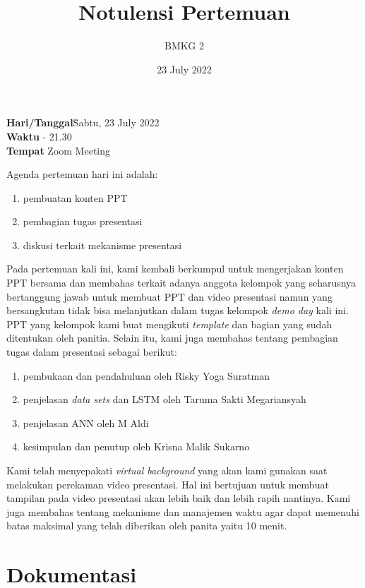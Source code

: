 \documentclass[12pt, a4paper]{article}
\title{Notulensi Pertemuan}
\author{BMKG 2}
\date{23 July 2022}
\begin{document}
\maketitle

\begin{tabbing}
\textbf{Hari/Tanggal}\quad\= Sabtu, 23 July 2022 \\
\textbf{Waktu}  - 21.30 \\
\textbf{Tempat}\> Zoom Meeting
\end{tabbing}

Agenda pertemuan hari ini adalah:
\begin{enumerate}
\item pembuatan konten PPT
\item pembagian tugas presentasi
\item diskusi terkait mekanisme presentasi
\end{enumerate}

\bigskip 
Pada pertemuan kali ini, kami kembali berkumpul untuk mengerjakan konten PPT bersama dan membahas terkait adanya anggota kelompok yang seharusnya bertanggung jawab untuk membuat PPT dan video presentasi namun yang bersangkutan tidak bisa melanjutkan dalam tugas kelompok \emph{demo day} kali ini. PPT yang kelompok kami buat mengikuti \emph{template} dan bagian yang sudah ditentukan oleh panitia. Selain itu, kami juga membahas tentang pembagian tugas dalam presentasi sebagai berikut:
\begin{enumerate}
\item pembukaan dan pendahuluan oleh Risky Yoga Suratman
\item penjelasan \emph{data sets} dan LSTM oleh Taruma Sakti Megariansyah
\item penjelasan ANN oleh M Aldi
\item kesimpulan dan penutup oleh Krisna Malik Sukarno
\end{enumerate}

\medskip
Kami telah menyepakati \emph{virtual background} yang akan kami gunakan saat melakukan perekaman video presentasi. Hal ini bertujuan untuk membuat tampilan pada video presentasi akan lebih baik dan lebih rapih nantinya. Kami juga membahas tentang mekanisme dan manajemen waktu agar dapat memenuhi batas maksimal yang telah diberikan oleh panita yaitu 10 menit.


\bigskip
\section*{Dokumentasi}
\end{document}
